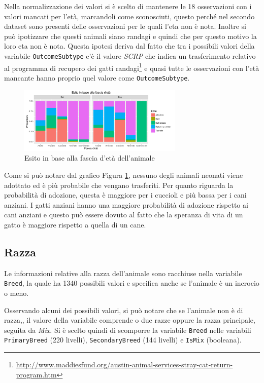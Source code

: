Nella normalizzazione dei valori si è scelto di mantenere le 18 osservazioni con i valori mancati per l'età, marcandoli come sconosciuti, questo perché nel secondo dataset sono presenti delle osservazioni per le quali l'eta non è nota. Inoltre si può ipotizzare che questi animali siano randagi e quindi che per questo motivo la loro eta non è nota.
Questa ipotesi deriva dal fatto che tra i possibili valori della variabile \texttt{OutcomeSubtype} c'è il valore \textit{SCRP} che indica un trasferimento relativo al programma di recupero dei gatti randagi\footnote{\url{http://www.maddiesfund.org/austin-animal-services-stray-cat-return-program.htm}} e quasi tutte le osservazioni con l'età mancante hanno proprio quel valore come \texttt{OutcomeSubtype}.

\begin{figure}[htbp]
	\centering
	\includegraphics[width=0.7\textwidth]{./grafici/esito_eta.pdf}
	\caption{Esito in base alla fascia d'età dell'animale}\label{fig-eta}
\end{figure}

Come si può notare dal grafico Figura \ref{fig-eta}, nessuno degli animali neonati viene adottato ed è più probabile che vengano trasferiti. Per quanto riguarda la probabilità di adozione, questa è maggiore per i cuccioli e più bassa per i cani anziani. I gatti anziani hanno una maggiore probabilità di adozione rispetto ai cani anziani e questo può essere dovuto al fatto che la speranza di vita di un gatto è maggiore rispetto a quella di un cane.

\subsection{Razza}

Le informazioni relative alla razza dell'animale sono racchiuse nella variabile \texttt{Breed}, la quale ha 1340 possibili valori e specifica anche se l'animale è un incrocio o meno.

Osservando alcuni dei possibili valori, si può notare che se l'animale non è di razza,, il valore della variabile comprende o due razze oppure la razza principale, seguita da \textit{Mix}. Si è scelto quindi di scomporre la variabile \texttt{Breed} nelle variabili \texttt{PrimaryBreed} (220 livelli), \texttt{SecondaryBreed} (144 livelli) e \texttt{IsMix} (booleana).

